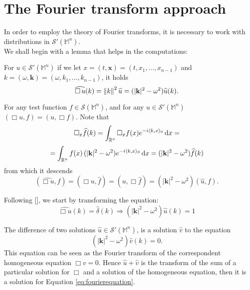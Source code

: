 \section{The Fourier transform approach}
In order to employ the theory of Fourier transforms, it is necessary to work with distributions in $\mathcal{S}'(\mathbb{M}^n)$.\\
We shall begin with a lemma that helps in the computations:
\begin{lem}
	For $u\in\mathcal{S}'(\mathbb{M}^n)$ if we let $x=(t,\mathbf{x})=(t,x_1,\dots,x_{n-1})$ and $k=(\omega,\mathbf{k})=(\omega,k_1,\dots,k_{n-1})$, it holds
	\begin{equation}
	\widehat{\Box\, u}(k)=\displaystyle \left \| k \right \|^2\widehat{u}=(|\mathbf{k}|^2-\omega^2)\widehat{u}(k).
	\end{equation}
\end{lem}
\Proof For any test function $f\in\mathcal{S}(\mathbb{M}^n)$, and for any $u\in\mathcal{S}'(\mathbb{M}^n)$ $(\Box u,f)=(u,\Box f)$. Note that $$\Box_x\widehat{f}(k)=\int_{{\mathbb R}^n}\Box_x f(x) e^{-i\langle k,x\rangle_0}\,\mathrm d x=$$
$$=\int_{{\mathbb R}^n}f(x)\,(|\mathbf{k}|^2-\omega^2)e^{-i\langle k,x\rangle_0}\,\mathrm d x=(|\mathbf{k}|^2-\omega^2)\widehat{f}(k)$$ from which it descends
\[	(\widehat{\Box u},f)=(\Box u,\widehat{f})=(u,\Box\widehat{f})=(|\mathbf{k}|^2-\omega^2)(\widehat{u},f).		\]\endproof


\noindent Following [\citealp[Ch. 5]{jonsson}], we start by transforming the equation:
\begin{equation}	\widehat{\Box u}(k)=\hat{\delta}(k) \Rightarrow	(|\mathbf{k}|^2-\omega^2)\hat{u}(k)=1
\label{eq:fourierequation}
\end{equation}	

\noindent The difference of two solutions $\hat{u}\in\mathcal{S}'(\mathbb{M}^n)$, is a solution $\hat{v}$ to the equation
\begin{equation}
	(|\mathbf{k}|^2-\omega^2)\hat{v}(k)=0.
	\label{eq:homogeneous}
\end{equation}
This equation can be seen as the Fourier transform of the correspondent homogeneous equation $\Box v=0$. Hence $\widehat{u}+\widehat{v}$ is the transform of the sum of a particular solution for $\Box$ and a solution of the homogeneous equation, then it is a solution for Equation \eqref{eq:fourierequation}.\\

